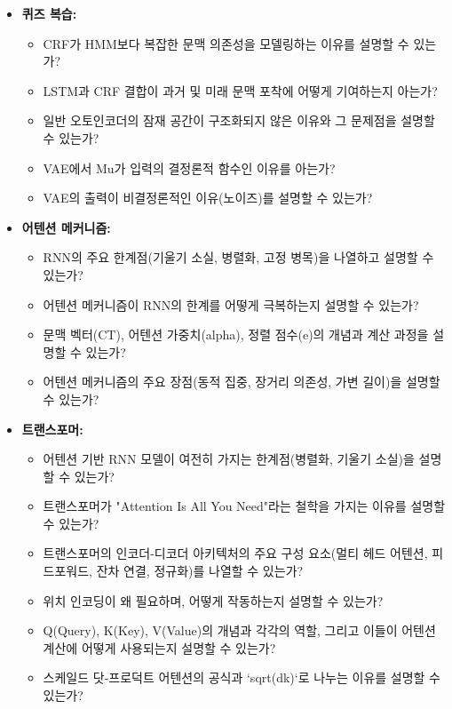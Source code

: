 \documentclass[11pt,a4paper]{article}
\begin{document}
\begin{summarybox}[title={학습 점검 체크리스트}]
\begin{itemize}
    \item \textbf{퀴즈 복습:}
    \begin{itemize}
        \item CRF가 HMM보다 복잡한 문맥 의존성을 모델링하는 이유를 설명할 수 있는가?
        \item LSTM과 CRF 결합이 과거 및 미래 문맥 포착에 어떻게 기여하는지 아는가?
        \item 일반 오토인코더의 잠재 공간이 구조화되지 않은 이유와 그 문제점을 설명할 수 있는가?
        \item VAE에서 Mu가 입력의 결정론적 함수인 이유를 아는가?
        \item VAE의 출력이 비결정론적인 이유(노이즈)를 설명할 수 있는가?
    \end{itemize}
    \item \textbf{어텐션 메커니즘:}
    \begin{itemize}
        \item RNN의 주요 한계점(기울기 소실, 병렬화, 고정 병목)을 나열하고 설명할 수 있는가?
        \item 어텐션 메커니즘이 RNN의 한계를 어떻게 극복하는지 설명할 수 있는가?
        \item 문맥 벡터(CT), 어텐션 가중치(alpha), 정렬 점수(e)의 개념과 계산 과정을 설명할 수 있는가?
        \item 어텐션 메커니즘의 주요 장점(동적 집중, 장거리 의존성, 가변 길이)을 설명할 수 있는가?
    \end{itemize}
    \item \textbf{트랜스포머:}
    \begin{itemize}
        \item 어텐션 기반 RNN 모델이 여전히 가지는 한계점(병렬화, 기울기 소실)을 설명할 수 있는가?
        \item 트랜스포머가 "Attention Is All You Need"라는 철학을 가지는 이유를 설명할 수 있는가?
        \item 트랜스포머의 인코더-디코더 아키텍처의 주요 구성 요소(멀티 헤드 어텐션, 피드포워드, 잔차 연결, 정규화)를 나열할 수 있는가?
        \item 위치 인코딩이 왜 필요하며, 어떻게 작동하는지 설명할 수 있는가?
        \item Q(Query), K(Key), V(Value)의 개념과 각각의 역할, 그리고 이들이 어텐션 계산에 어떻게 사용되는지 설명할 수 있는가?
        \item 스케일드 닷-프로덕트 어텐션의 공식과 `sqrt(dk)`로 나누는 이유를 설명할 수 있는가?

\end{itemize}
\end{itemize}
\end{summarybox}
\end{document}

